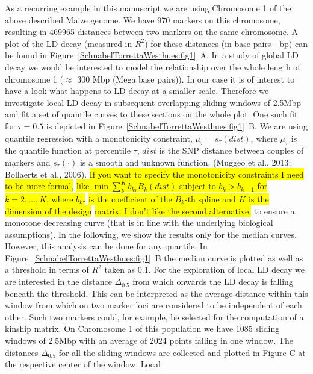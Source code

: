 \documentclass[twoside]{report}
\begin{document}
As a recurring example in this manuscript we are using Chromosome 1 of the above described 
	Maize genome. We have 970 markers 
	on this chromosome, resulting in 469965 distances 
	between two markers on the same chromosome. A plot of the LD decay (measured in $R^2$) 
	for these distances (in base pairs - bp) can be found 
	in Figure~\ref{SchnabelTorrettaWesthues:fig1}~A. 
	In a study of global 
	LD decay we would be interested to model the relationship over the whole length of chromosome 1 ($\approx$ 300 Mbp (Mega base pairs)). 
	In our case it is of interest to have a look what happens to 
	LD decay at a smaller scale. Therefore we investigate local LD decay in subsequent 
	overlapping sliding windows of 2.5Mbp and fit a set of quantile curves to these 
	sections on the whole plot. One such fit for $\tau = 0.5$ is depicted 
	in Figure~\ref{SchnabelTorrettaWesthues:fig1}~B. 
	We are using quantile 
	regression with a monotonicity constraint,
	$\mu_{\tau}=s_{\tau}(dist)$, where $\mu_\tau$ is the quantile function at percentile $\tau$, $dist$ is the SNP distance between couples of markers and $s_{\tau}(\cdot)$ is a smooth and unknown function. (Muggeo et al., 2013; Bollaerts et al., 2006).
	\colorbox{yellow}{If you want to specify the monotonicity constraints I need to be more 
	formal,} 
	\colorbox{yellow}{like
	$\min\sum_k^K b_{k\tau} B_k(dist)$ subject to $b_k>b_{k-1}$ for $k=2,\dots,K$, 
	where $b_{k\tau}$}
	\colorbox{yellow}{is the coefficient of the $B_k$-th spline and $K$ is the dimension of the design}
	\colorbox{yellow}{ matrix. 
	I don't like the second alternative.}
	to ensure a monotone decreasing curve (that is 
	in line with the underlying biological assumptions). In the following, we show the 
	results only for the median curves. However, this analysis can be done for any quantile.  
	In Figure~\ref{SchnabelTorrettaWesthues:fig1}~B the median curve is 
	plotted as well as a threshold in terms of $R^2$ taken as 
	0.1. For the exploration of local LD decay we are interested in the distance $\Delta_{0.5}$ from 
	which onwards the LD decay is falling beneath the threshold. This can be interpreted as the
	average distance within this window from which on two marker loci are considered to be 
	independent of each other. Such two markers could, for example, be selected for the computation
	of a kinship matrix.
	On Chromosome 1 of this population we have 1085 sliding windows
	 of 2.5Mbp with an 
	average of 2024 points falling in one window. The distances 
	$\Delta_{0.5}$ for all the sliding windows are collected and plotted in Figure C 
	at the respective center of the window. Local 
\end{document}
